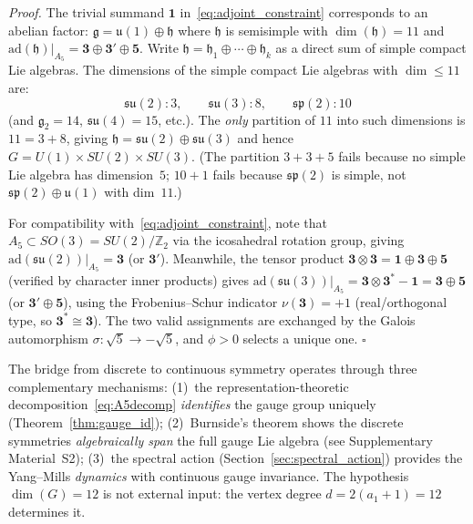 \documentclass[12pt,a4paper]{article}
\theoremstyle{definition}
\begin{document}
\noindent\textit{Proof.}  The trivial summand $\mathbf{1}$ in~\eqref{eq:adjoint_constraint} corresponds to an abelian factor: $\mathfrak{g} = \mathfrak{u}(1) \oplus \mathfrak{h}$ where $\mathfrak{h}$ is semisimple with $\dim(\mathfrak{h}) = 11$ and $\mathrm{ad}(\mathfrak{h})|_{A_5} = \mathbf{3} \oplus \mathbf{3'} \oplus \mathbf{5}$.  Write $\mathfrak{h} = \mathfrak{h}_1 \oplus \cdots \oplus \mathfrak{h}_k$ as a direct sum of simple compact Lie algebras.  The dimensions of the simple compact Lie algebras with $\dim \leq 11$ are:
\begin{equation}
\mathfrak{su}(2) : 3, \qquad \mathfrak{su}(3) : 8, \qquad \mathfrak{sp}(2) : 10
\end{equation}
(and $\mathfrak{g}_2 = 14$, $\mathfrak{su}(4) = 15$, etc.).  The \emph{only} partition of $11$ into such dimensions is $11 = 3 + 8$, giving $\mathfrak{h} = \mathfrak{su}(2) \oplus \mathfrak{su}(3)$ and hence $G = U(1) \times SU(2) \times SU(3)$.  (The partition $3 + 3 + 5$ fails because no simple Lie algebra has dimension~$5$; $10 + 1$ fails because $\mathfrak{sp}(2)$ is simple, not $\mathfrak{sp}(2) \oplus \mathfrak{u}(1)$ with dim~$11$.)

For compatibility with~\eqref{eq:adjoint_constraint}, note that $A_5 \subset SO(3) = SU(2)/\mathbb{Z}_2$ via the icosahedral rotation group, giving $\mathrm{ad}(\mathfrak{su}(2))|_{A_5} = \mathbf{3}$ (or $\mathbf{3'}$).  Meanwhile, the tensor product $\mathbf{3} \otimes \mathbf{3} = \mathbf{1} \oplus \mathbf{3} \oplus \mathbf{5}$ (verified by character inner products) gives $\mathrm{ad}(\mathfrak{su}(3))|_{A_5} = \mathbf{3} \otimes \mathbf{3}^* - \mathbf{1} = \mathbf{3} \oplus \mathbf{5}$ (or $\mathbf{3'} \oplus \mathbf{5}$), using the Frobenius--Schur indicator $\nu(\mathbf{3}) = +1$ (real/orthogonal type, so $\mathbf{3}^* \cong \mathbf{3}$).  The two valid assignments are exchanged by the Galois automorphism $\sigma: \sqrt{5} \to -\sqrt{5}$, and $\phi > 0$ selects a unique one. \hfill$\square$

The bridge from discrete to continuous symmetry operates through three complementary mechanisms: (1)~the representation-theoretic decomposition~\eqref{eq:A5decomp} \emph{identifies} the gauge group uniquely (Theorem~\ref{thm:gauge_id}); (2)~Burnside's theorem shows the discrete symmetries \emph{algebraically span} the full gauge Lie algebra (see Supplementary Material~S2); (3)~the spectral action (Section~\ref{sec:spectral_action}) provides the Yang--Mills \emph{dynamics} with continuous gauge invariance.  The hypothesis $\dim(G) = 12$ is not external input: the vertex degree $d = 2(a_1+1) = 12$ determines it.
\end{document}
